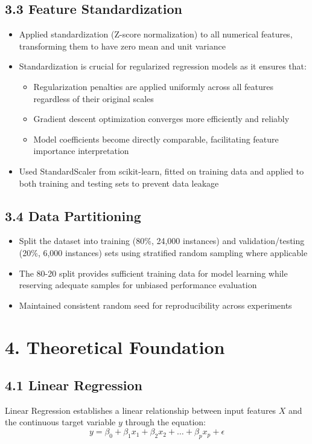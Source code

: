 \documentclass[11pt]{article}
\begin{document}
\subsection*{3.3 Feature Standardization}
\begin{itemize}
\item Applied standardization (Z-score normalization) to all numerical features, transforming them to have zero mean and unit variance
\item Standardization is crucial for regularized regression models as it ensures that:
\begin{itemize}
\item Regularization penalties are applied uniformly across all features regardless of their original scales
\item Gradient descent optimization converges more efficiently and reliably
\item Model coefficients become directly comparable, facilitating feature importance interpretation
\end{itemize}
\item Used StandardScaler from scikit-learn, fitted on training data and applied to both training and testing sets to prevent data leakage
\end{itemize}

\subsection*{3.4 Data Partitioning}
\begin{itemize}
\item Split the dataset into training (80\%, 24,000 instances) and validation/testing (20\%, 6,000 instances) sets using stratified random sampling where applicable
\item The 80-20 split provides sufficient training data for model learning while reserving adequate samples for unbiased performance evaluation
\item Maintained consistent random seed for reproducibility across experiments
\end{itemize}

\section*{4. Theoretical Foundation}

\subsection*{4.1 Linear Regression}
Linear Regression establishes a linear relationship between input features $X$ and the continuous target variable $y$ through the equation:
\[
y = \beta_0 + \beta_1 x_1 + \beta_2 x_2 + \ldots + \beta_p x_p + \epsilon
\]
\end{document}
